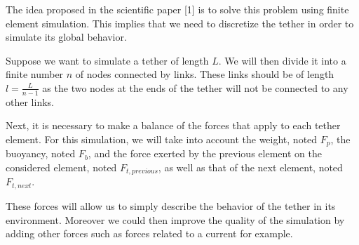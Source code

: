 The idea proposed in the scientific paper [1] is to solve this problem using finite element simulation. This implies that we need to discretize the tether in order to simulate its global behavior.

Suppose we want to simulate a tether of length $L$. We will then divide it into a finite number $n$ of nodes connected by links. These links should be of length $l=\frac{L}{n-1}$ as the two nodes at the ends of the tether will not be connected to any other links.

Next, it is necessary to make a balance of the forces that apply to each tether element. For this simulation, we will take into account the weight, noted $F_p$, the buoyancy, noted $F_b$, and the force exerted by the previous element on the considered element, noted $F_{t, previous}$, as well as that of the next element, noted $F_{t, next}$.

These forces will allow us to simply describe the behavior of the tether in its environment. Moreover we could then improve the quality of the simulation by adding other forces such as forces related to a current for example.